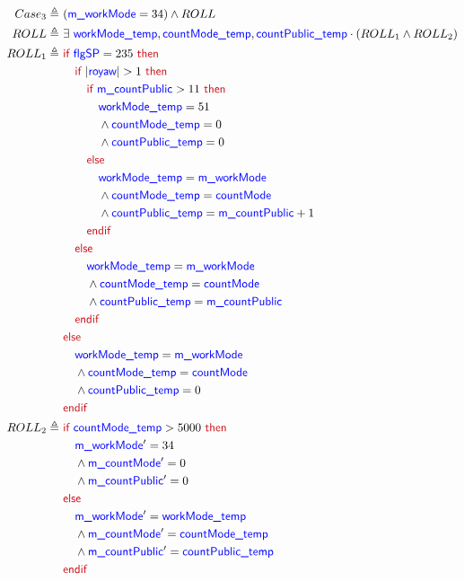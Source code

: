 \documentclass[fleqn,a4paper]{article}
\newcommand\Var[1]{\textcolor{blue}{\textsf{#1}}}
\newcommand\syntax[1]{\textcolor[RGB]{202,12,22}{\textsf{#1}}}
\newcommand\definedby{\triangleq}
\begin{document}
\begin{description}
\begin{align*}
Case_3 \definedby \
& (\Var{m\_workMode} = 34) \wedge ROLL \\
ROLL \definedby \
& \exists \ \Var{workMode\_temp}, \Var{countMode\_temp}, \Var{countPublic\_temp} \cdot ( ROLL_1 \wedge ROLL_2 ) \\
ROLL_1 \definedby \
& \syntax{if } \Var{flgSP} = 235 \syntax{ then} \\
& \quad \syntax{if } |\Var{royaw}| > 1 \syntax{ then} \\
& \quad \quad \syntax{if } \Var{m\_countPublic} > 11 \syntax{ then} \\
& \quad \quad \quad \Var{workMode\_temp} = 51 \\
& \quad \quad \quad \wedge \Var{countMode\_temp} = 0 \\
& \quad \quad \quad \wedge \Var{countPublic\_temp} = 0 \\
& \quad \quad \syntax{else} \\
& \quad \quad \quad \Var{workMode\_temp} = \Var{m\_workMode} \\
& \quad \quad \quad \wedge \Var{countMode\_temp} = \Var{countMode} \\
& \quad \quad \quad \wedge \Var{countPublic\_temp} = \Var{m\_countPublic} + 1 \\
& \quad \quad \syntax{endif} \\
& \quad \syntax{else} \\
& \quad \quad \Var{workMode\_temp} = \Var{m\_workMode} \\
& \quad \quad \wedge \Var{countMode\_temp} = \Var{countMode} \\
& \quad \quad \wedge \Var{countPublic\_temp} = \Var{m\_countPublic} \\
& \quad \syntax{endif} \\
& \syntax{else} \\
& \quad \Var{workMode\_temp} = \Var{m\_workMode} \\
& \quad \wedge \Var{countMode\_temp} = \Var{countMode} \\
& \quad \wedge \Var{countPublic\_temp} = 0 \\
& \syntax{endif} \\
ROLL_2 \definedby \
& \syntax{if } \Var{countMode\_temp} > 5000 \syntax{ then} \\
& \quad \Var{m\_workMode}' = 34 \\
& \quad \wedge \Var{m\_countMode}' = 0 \\
& \quad \wedge \Var{m\_countPublic}' = 0 \\
& \syntax{else} \\
& \quad \Var{m\_workMode}' = \Var{workMode\_temp} \\
& \quad \wedge \Var{m\_countMode}' = \Var{countMode\_temp} \\
& \quad \wedge \Var{m\_countPublic}' = \Var{countPublic\_temp} \\
& \syntax{endif}
\end{align*}


\end{description}
\end{document}
